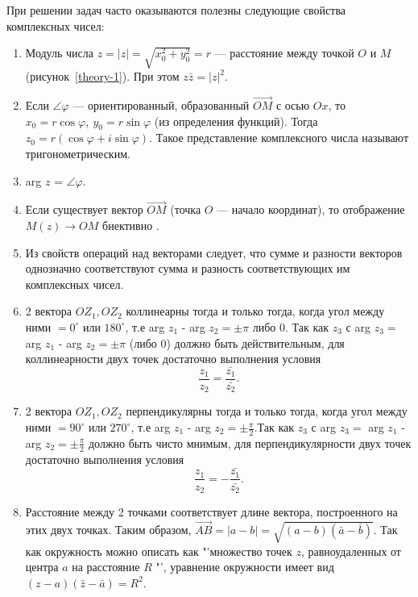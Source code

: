 При решении задач часто оказываются полезны следующие свойства комплексных чисел:
\begin{enumerate}
   \item Модуль числа $z = \vert z\vert = \sqrt{x_0^2+y_0^2} = r$ --- расстояние между точкой
         \(O\) и \(M\) (рисунок~\ref{theory-1}). При этом \(z\bar{z} = |z|^2\).
   \item Если $\angle \varphi$ --- ориентированный, образованный $\overrightarrow{OM}$
         с осью \(Ox\), то $x_0 = r\cos \varphi,~y_0 = r\sin \varphi$ (из определения функций).
         Тогда $z_0 = r(\cos \varphi + i \sin \varphi)$. Такое представление комплексного
         числа называют тригонометрическим.
   \item arg $z$ = $\angle \varphi$.
   \item Если существует вектор \(\overrightarrow{OM}\) (точка \(O\) --- начало координат),
         то отображение \(M(z) \rightarrow OM\) биективно \cite[с. 32]{book:jaglom}.
   \item Из свойств операций над векторами следует, что сумме и разности векторов однозначно
         соответствуют сумма и разность соответствующих им комплексных чисел.
   \item 2 вектора \(OZ_1,OZ_2\) коллинеарны тогда и только тогда, когда угол между ними \(= 0^\circ\)
         или \(180^\circ\), т.е arg \(z_1\) - arg \(z_2 = \pm \pi\) либо \(0\). Так как \(z_3\) с
         arg \(z_3 =\) arg \(z_1\) - arg \(z_2 = \pm \pi\) (либо \(0\)) должно быть действительным, для
         коллинеарности двух точек достаточно выполнения условия
         \begin{equation*}
            \frac{z_1}{z_2} = \frac{\bar{z_1}}{\bar{z_2}}.
         \end{equation*}
   \item 2 вектора \(OZ_1,OZ_2\) перпендикулярны тогда и только тогда, когда угол между ними
         \(= 90^\circ\) или \(270^\circ\), т.е arg \(z_1\) - arg \(z_2 = \pm \frac{\pi}{2}\).Так как \(z_3\) с
         arg \(z_3 =\) arg \(z_1\) - arg \(z_2 = \pm \frac{\pi}{2}\) должно быть чисто мнимым,
         для перпендикулярности двух точек достаточно выполнения условия
         \begin{equation*}
            \frac{z_1}{z_2} = -\frac{\bar{z_1}}{\bar{z_2}}.
         \end{equation*}
   \item Расстояние между 2 точками соответствует длине вектора, построенного на этих двух
         точках. Таким образом, \(\overrightarrow{AB} = |a-b| = \sqrt{(a-b)(\bar{a}-\bar{b})}\). Так как окружность
         можно описать как "'множество точек \(z\), равноудаленных от центра \(a\) на расстояние \(R\) "',
         уравнение окружности имеет вид \((z-a)(\bar{z}-\bar{a}) = R^2\).
         \label{theory-properties}
\end{enumerate}
